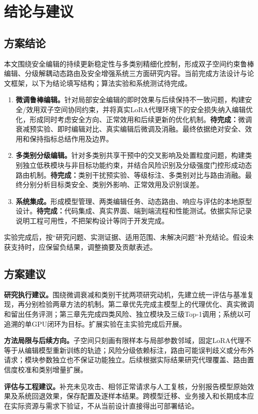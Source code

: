\chapter{结论与建议}\label{chap:conclusion}

\section{方案结论}
本文围绕安全编辑的持续更新稳定性与多类别精细化控制，形成双子空间约束鲁棒编辑、分级解耦动态路由及安全增强系统三方面研究内容。当前完成方法设计与论文框架，以下为结论填写结构；算法实验和系统测试待完成。
\begin{enumerate}[label={（\arabic*）},leftmargin=*]
  \item \textbf{微调鲁棒编辑。}针对局部安全编辑的即时效果与后续保持不一致问题，构建安全/效用双子空间协同约束，并将真实LoRA代理环境下的安全损失纳入编辑优化，形成同时考虑安全方向、正常效用和后续更新的优化机制。\textbf{待完成：}微调衰减预实验、即时编辑对比、真实编辑后微调及消融。最终依据绝对安全、效用和保持指标总结作用及边界。
  \item \textbf{多类别分级编辑。}针对多类别共享干预中的交叉影响及处置粒度问题，构建类别独立低秩模块与非目标功能约束，并结合风险识别及分级强度门控形成动态路由机制。\textbf{待完成：}类别干扰预实验、等级标注、多类别对比与路由消融。最终分别分析目标类安全、类别外影响、正常效用及识别误差。
  \item \textbf{系统集成。}形成模型管理、两类编辑任务、动态路由、响应与评估的本地原型设计。\textbf{待完成：}代码集成、真实界面、端到端流程和性能测试。依据实际记录说明工程可用性，不把架构设计等同于开发完成。
\end{enumerate}

实验完成后，按“研究问题、实测证据、适用范围、未解决问题”补充结论。假设未获支持时，应保留负结果，调整摘要及贡献表述。

\section{方案建议}
\textbf{研究执行建议。}围绕微调衰减和类别干扰两项研究动机，先建立统一评估与基准复现，再分别检验两章方法的机制。第二章优先完成主模型上的代理优化、真实微调和留出任务评测；第三章先完成四类风险、独立模块及三级Top-1调用；系统以可追溯的单GPU闭环为目标。扩展实验在主实验完成后开展。

\textbf{方法局限与后续方向。}子空间只刻画有限样本与局部参数邻域，固定LoRA代理不等于从编辑模型重新训练的轨迹；风险分级依赖标注，路由可能误判歧义或分布外请求；模块参数独立也不保证功能独立。后续根据实际结果研究代理覆盖、路由置信度校准和类别增量扩展。

\textbf{评估与工程建议。}补充未见攻击、相邻正常请求与人工复核，分别报告模型原始效果及系统回退效果，保存配置及逐样本结果。跨模型迁移、业务接入和长期成本应在实际资源与需求下验证，不从当前设计直接得出可部署结论。
